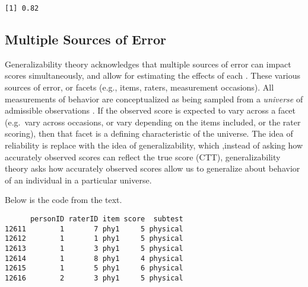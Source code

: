 \documentclass[
]{book}
\newenvironment{Shaded}{\begin{snugshade}}{\end{snugshade}}
\newcommand{\FunctionTok}[1]{\textcolor[rgb]{0.00,0.00,0.00}{#1}}
\newcommand{\NormalTok}[1]{#1}
\newcommand{\OtherTok}[1]{\textcolor[rgb]{0.56,0.35,0.01}{#1}}
\newcommand{\SpecialCharTok}[1]{\textcolor[rgb]{0.00,0.00,0.00}{#1}}
\newcommand{\StringTok}[1]{\textcolor[rgb]{0.31,0.60,0.02}{#1}}
\begin{document}
\begin{verbatim}
[1] 0.82
\end{verbatim}

\hypertarget{multiple-sources-of-error}{%
\subsection{Multiple Sources of Error}\label{multiple-sources-of-error}}

Generalizability theory acknowledges that multiple sources of error can impact scores simultaneously, and allow for estimating the effects of each \citep{raykov2011introduction}.
These various sources of error, or facets (e.g., items, raters, measurement occasions).
All measurements of behavior are conceptualized as being sampled from a \emph{universe} of admissible observations \citep{raykov2011introduction}.
If the observed score is expected to vary across a facet (e.g.~vary across occasions, or vary depending on the items included, or the rater scoring), then that facet is a defining characteristic of the universe.
The idea of reliability is replace with the idea of generalizability, which ,instead of asking how accurately observed scores can reflect the true score (CTT), generalizability theory asks how accurately observed scores allow us to generalize about behavior of an individual in a particular universe.

Below is the code from the \citet{mair2018modern} text.

\begin{Shaded}
\end{Shaded}

\begin{verbatim}
      personID raterID item score  subtest
12611        1       7 phy1     5 physical
12612        1       1 phy1     5 physical
12613        1       3 phy1     5 physical
12614        1       8 phy1     4 physical
12615        1       5 phy1     6 physical
12616        2       3 phy1     5 physical
\end{verbatim}
\end{document}
